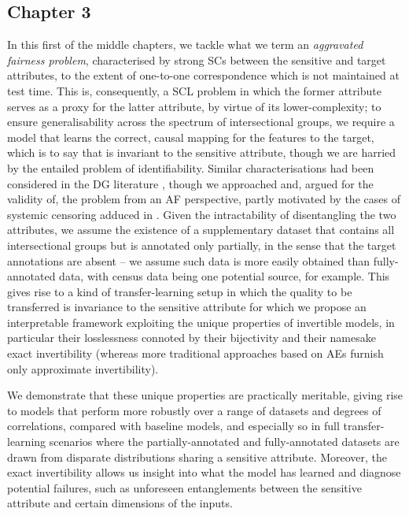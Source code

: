 \subsection*{Chapter 3}%
%
In this first of the middle chapters, we tackle what we term an \emph{aggravated fairness problem},
characterised by strong \acp{SC} between the sensitive and target attributes, to the extent of
one-to-one correspondence which is not maintained at test time.
%
This is, consequently, a \ac{SCL} problem in which the former attribute serves as a proxy
for the latter attribute, by virtue of its lower-complexity; to ensure generalisability across the
spectrum of intersectional groups, we require a model that learns the correct, causal mapping for
the features to the target, which is to say that is invariant to the sensitive attribute, though we
are harried by the entailed problem of identifiability.
%
Similar characterisations had been considered in the \ac{DG} literature
\citep{arjovsky2019invariant, jacobsen2019excessive}, though we approached and, argued for the
validity of, the problem from an \ac{AF} perspective, partly motivated by the cases of systemic
censoring adduced in \citet{kallus2018residual}.
%
Given the intractability of disentangling the two attributes, we assume the existence of a
supplementary dataset that contains all intersectional groups but is annotated only partially, in
the sense that the target annotations are absent -- we assume such data is more easily obtained
than fully-annotated data, with census data being one potential source, for example.
%
This gives rise to a kind of transfer-learning setup in which the quality to be transferred is
invariance to the sensitive attribute for which we propose an interpretable framework exploiting
the unique properties of invertible models, in particular their losslessness connoted by their
bijectivity and their namesake exact invertibility (whereas more traditional approaches based on
\acp{AE} furnish only approximate invertibility).
%

We demonstrate that these unique properties are practically meritable, giving rise to models that
perform more robustly over a range of datasets and degrees of correlations, compared with baseline
models, and especially so in full transfer-learning scenarios where the partially-annotated and
fully-annotated datasets are drawn from disparate distributions sharing a sensitive attribute.
%
Moreover, the exact invertibility allows us insight into what the model has learned and diagnose
potential failures, such as unforeseen entanglements between the sensitive attribute and certain
dimensions of the inputs.
%

